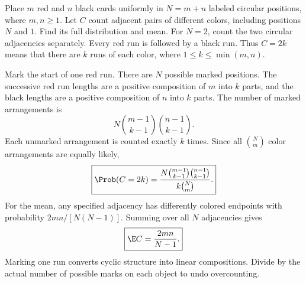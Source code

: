 Place $m$ red and $n$ black cards uniformly in $N=m+n$ labeled circular positions, where $m,n\ge1$. Let $C$ count adjacent pairs of different colors, including positions $N$ and $1$. Find its full distribution and mean. For $N=2$, count the two circular adjacencies separately.
\solution Every red run is followed by a black run. Thus $C=2k$ means that there are $k$ runs of each color, where $1\le k\le\min(m,n)$.

Mark the start of one red run. There are $N$ possible marked positions. The successive red run lengths are a positive composition of $m$ into $k$ parts, and the black lengths are a positive composition of $n$ into $k$ parts. The number of marked arrangements is
\[
N\binom{m-1}{k-1}\binom{n-1}{k-1}.
\]
Each unmarked arrangement is counted exactly $k$ times. Since all $\binom Nm$ color arrangements are equally likely,
\[
\boxed{\Prob(C=2k)=\frac{N\binom{m-1}{k-1}\binom{n-1}{k-1}}
{k\binom Nm}.}
\]
For the mean, any specified adjacency has differently colored endpoints with probability $2mn/[N(N-1)]$. Summing over all $N$ adjacencies gives
\[
\boxed{\E C=\frac{2mn}{N-1}.}
\]
\insight Marking one run converts cyclic structure into linear compositions. Divide by the actual number of possible marks on each object to undo overcounting.
